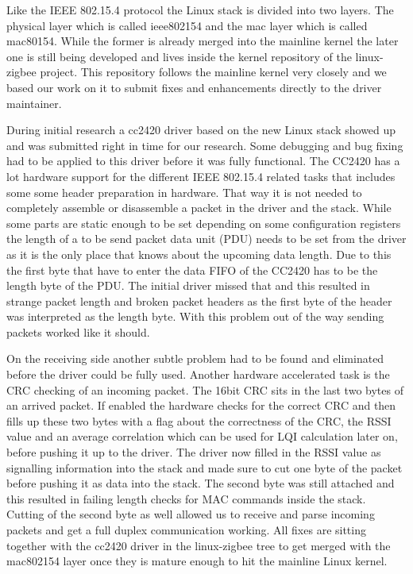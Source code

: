 Like the IEEE 802.15.4 protocol the Linux stack is divided into two layers. The
physical layer which is called ieee802154 and the mac layer which is called
mac80154. While the former is already merged into the mainline kernel the later
one is still being developed and lives inside the kernel repository of the
linux-zigbee project. This repository follows the mainline kernel very closely
and we based our work on it to submit fixes and enhancements directly to the driver
maintainer.

During initial research a cc2420 driver based on the new Linux stack showed up
and was submitted right in time for our research. Some debugging and bug fixing
had to be applied to this driver before it was fully functional. The CC2420 has
a lot hardware support for the different IEEE 802.15.4 related tasks that includes
some some header preparation in hardware. That way it is not needed to
completely assemble or disassemble a packet in the driver and the stack. While
some parts are static enough to be set depending on some configuration registers
the length of a to be send packet data unit (PDU) needs to be set from the driver
as it is the only place that knows about the upcoming data length. Due to this
the first byte that have to enter the data FIFO of the CC2420 has to be the
length byte of the PDU. The initial driver missed that and this resulted in
strange packet length and broken packet headers as the first byte of the header
was interpreted as the length byte. With this problem out of the way sending
packets worked like it should.

On the receiving side another subtle problem had to be found and eliminated
before the driver could be fully used. Another hardware accelerated task is the
CRC checking of an incoming packet. The 16bit CRC sits in the last two bytes of
an arrived packet. If enabled the hardware checks for the correct CRC and
then fills up these two bytes with a flag about the correctness of the CRC, the
RSSI value and an average correlation which can be used for LQI calculation
later on, before pushing it up to the driver. The driver now filled in the RSSI
value as signalling information into the stack and made sure to cut one byte
of the packet before pushing it as data into the stack. The second byte was
still attached and this resulted in failing length checks for MAC commands
inside the stack. Cutting of the second byte as well allowed us to receive
and parse incoming packets and get a full duplex communication working. All
fixes are sitting together with the cc2420 driver in the linux-zigbee tree to
get merged with the mac802154 layer once they is mature enough to hit the
mainline Linux kernel.

